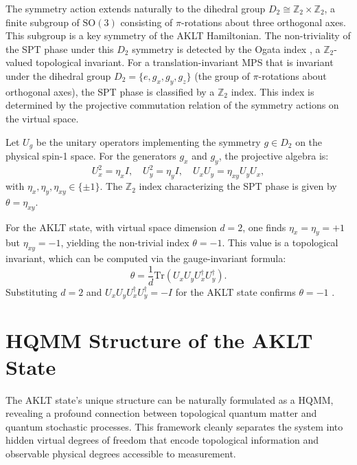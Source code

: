 \documentclass[12pt,a4paper]{article}
\begin{document}
The symmetry action extends naturally to the dihedral group $D_2 \cong \mathbb{Z}_2 \times \mathbb{Z}_2$, a finite subgroup of $\mathrm{SO}(3)$ consisting of $\pi$-rotations about three orthogonal axes. This subgroup is a key symmetry of the AKLT Hamiltonian. The non-triviality of the SPT phase under this $D_2$ symmetry is detected by the Ogata index \cite{Tas23}, a $\mathbb{Z}_2$-valued topological invariant.
For a translation-invariant MPS that is invariant under the dihedral group $D_2 = \{e, g_x, g_y, g_z\}$ (the group of $\pi$-rotations about orthogonal axes), the SPT phase is classified by a $\mathbb{Z}_2$ index. This index is determined by the projective commutation relation of the symmetry actions on the virtual space.

Let $U_g$ be the unitary operators implementing the symmetry $g \in D_2$ on the physical spin-1 space.  For the generators $g_x$ and $g_y$, the projective algebra is:
\[
U_x^2 = \eta_x I, \quad U_y^2 = \eta_y I, \quad U_x U_y = \eta_{xy} U_y U_x,
\]
with $\eta_x, \eta_y, \eta_{xy} \in \{\pm 1\}$. The $\mathbb{Z}_2$ index characterizing the SPT phase is given by $\theta = \eta_{xy}$.

For the AKLT state, with virtual space dimension $d=2$, one finds $\eta_x = \eta_y = +1$ but $\eta_{xy} = -1$, yielding the non-trivial index $\theta = -1$. This value is a topological invariant, which can be computed via the gauge-invariant formula:
\[
\theta = \frac{1}{d} \mathrm{Tr}(U_x U_y U_x^\dagger U_y^\dagger).
\]
Substituting $d=2$ and $U_x U_y U_x^\dagger U_y^\dagger = -I$ for the AKLT state confirms $\theta = -1$ \cite{Pollmann2010, Pollmann2012}.




\section{HQMM Structure of the AKLT State}\label{Sect_HQMM_AKLT}
The AKLT state's unique structure can be naturally formulated as a  HQMM, revealing a profound connection between topological quantum matter and quantum stochastic processes. This framework cleanly separates the system into hidden virtual degrees of freedom that encode topological information and observable physical degrees accessible to measurement.
\end{document}
